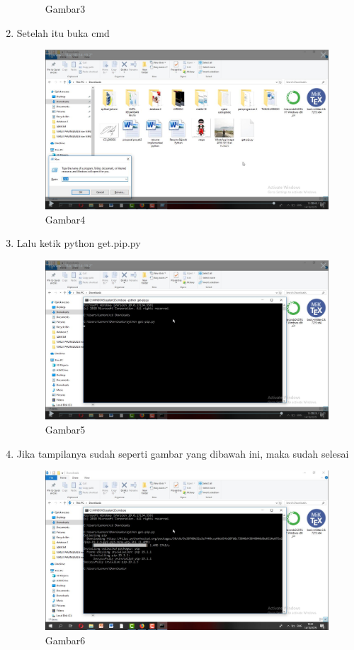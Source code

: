 \begin{enumerate}
\begin{figure}[h]
    \caption{Gambar3}
    \label{fig:my_label}
\end{figure}
\item Setelah itu buka cmd
\begin{figure}[h]
    \centering
    \includegraphics[scale=0.2]{gambar/pip4.png}
    \caption{Gambar4}
    \label{fig:my_label}
\end{figure}
\item Lalu ketik  python get.pip.py
\begin{figure}[h]
    \centering
    \includegraphics[scale=0.2]{gambar/pip5.png}
    \caption{Gambar5}
    \label{fig:my_label}
\end{figure}
\item Jika tampilanya sudah seperti gambar yang dibawah ini, maka sudah selesai
\begin{figure}[h]
    \centering
    \includegraphics[scale=0.2]{gambar/pip6.png}
    \caption{Gambar6}
    \label{fig:my_label}
\end{figure}
\end{enumerate}
